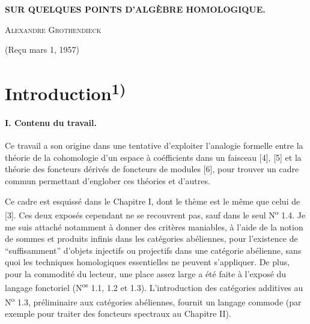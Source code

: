 \begin{center}
  {\Large\bfseries SUR QUELQUES POINTS D'ALGÈBRE HOMOLOGIQUE.\par}
  \vspace{1.2em}
  {\large\scshape Alexandre Grothendieck\par}
  \vspace{1.2em}
  {(Reçu mars 1, 1957)\par}
\end{center}

\section*{\centering Introduction\textsuperscript{1)}}

\paragraph{I. Contenu du travail.}
Ce travail a son origine dans une tentative d'exploiter l'analogie formelle
entre la théorie de la cohomologie d'un espace à coéfficients dans un faisceau
[4], [5] et la théorie des foncteurs dérivés de foncteurs de modules [6], pour
trouver un cadre commun permettant d'englober ces théories et d'autres.

Ce cadre est esquissé dans le Chapitre I, dont le thème est le même que celui
de [3]. Ces deux exposés cependant ne se recouvrent pas, sauf dans le seul
N\textsuperscript{o} 1.4. Je me suis attaché notamment à donner des critères
maniables, à l'aide de la notion de sommes et produits infinis dans les
catégories abéliennes, pour l'existence de ``suffisamment'' d'objets injectifs
ou projectifs dans une catégorie abélienne, sans quoi les techniques
homologiques essentielles ne peuvent s'appliquer. De plus, pour la commodité
du lecteur, une place assez large a été faite à l'exposé du langage fonctoriel
(N\textsuperscript{os} 1.1, 1.2 et 1.3). L'introduction des catégories
additives au N\textsuperscript{o} 1.3, préliminaire aux catégories abéliennes,
fournit un langage commode (par exemple pour traiter des foncteurs spectraux
au Chapitre II).

